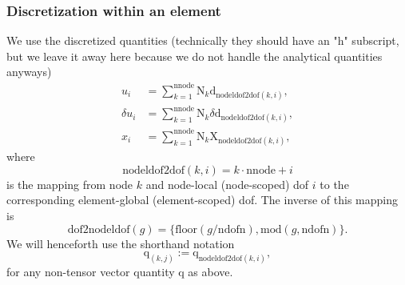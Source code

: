 \documentclass[12pt,a4paper]{article}
\theoremstyle{remark} %
\numberwithin{equation}{section} %
\begin{document}
\subsubsection{Discretization within an element}
We use the discretized quantities (technically they should have an "h" subscript, but we leave it away here because we do not handle the analytical quantities anyways)
\begin{align}
	u_i &= \sum_{k = 1}^{\text{nnode}} \mathrm N_k \mathrm d_{\text{nodeldof2dof}(k, i)} , \label{eq:uNd} \\
	\delta u_i &= \sum_{k = 1}^{\text{nnode}} \mathrm N_k \delta \mathrm d_{\text{nodeldof2dof}(k, i)} , \\
	x_i &= \sum_{k = 1}^{\text{nnode}} \mathrm N_k \mathrm X_{\text{nodeldof2dof}(k, i)} ,
\end{align}
where
\begin{equation}
	\text{nodeldof2dof}(k, i) = k \cdot \text{nnode} + i
\end{equation}
is the mapping from node $k$ and node-local (node-scoped) dof $i$ to the corresponding element-global (element-scoped) dof. The inverse of this mapping is
\begin{equation} \label{eq:dof2nodeldof}
	\text{dof2nodeldof}(g) = \{\text{floor}(g/\text{ndofn}), \text{mod}(g, \text{ndofn})\} .
\end{equation}
%
We will henceforth use the shorthand notation
\begin{equation} \label{eq:shorthandMapping}
	\mathrm q_{(k, j)} := \mathrm q_{\text{nodeldof2dof}(k, i)} ,
\end{equation}
for any non-tensor vector quantity $\mathrm q$ as above.
\end{document}
